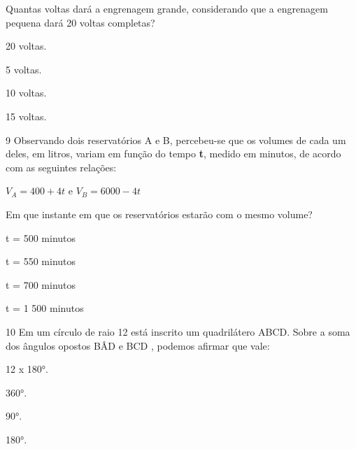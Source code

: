 Quantas voltas dará a engrenagem grande, considerando que a engrenagem
pequena dará 20 voltas completas?

\begin{escolha}

  \item 20 voltas.

  \item 5 voltas.

  \item 10 voltas.

  \item 15 voltas.

\end{escolha}

\pagebreak

\num{9} Observando dois reservatórios A e B, percebeu-se que os volumes de 
cada um deles, em litros, variam em função do tempo \textbf{t}, medido em
minutos, de acordo com as seguintes relações:

$V_A = 400 + 4t$ e $V_B = 6000 - 4t$

Em que instante em que os reservatórios estarão com o mesmo volume?

\begin{escolha}

  \item t = 500 minutos

  \item t = 550 minutos

  \item t = 700 minutos

  \item t = 1 500 minutos

\end{escolha}

\num{10} Em um círculo de raio 12 está inscrito um quadrilátero ABCD.
Sobre a soma dos ângulos opostos BÂD e BCD %
, podemos afirmar que vale:

\begin{escolha}

  \item 12 x 180°.

  \item 360°.

  \item 90°.

  \item 180°.

\end{escolha}



